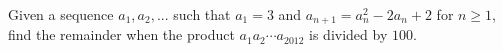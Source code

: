 Given a sequence $a_1, a_2, . . .$ such that $a_1 = 3$ and $a_{n+1} = a^2_n - 2a_n + 2$ for $n \ge 1$, find the remainder when the product $a_1a_2\cdots a_{2012}$ is divided by $100$.
